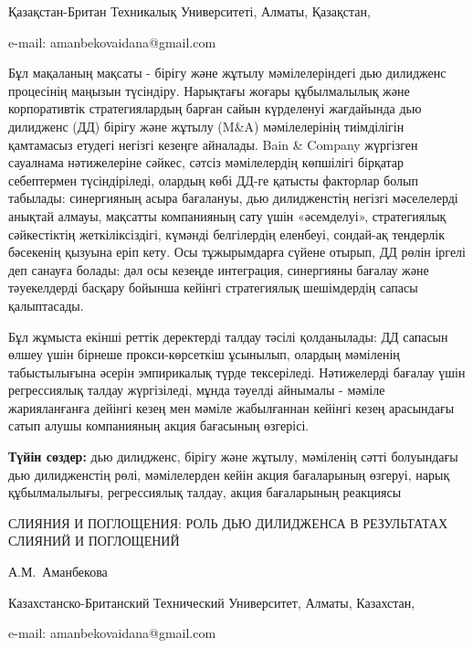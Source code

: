 \begin{affil}
Қазақстан-Британ Техникалық Университеті, Алматы, Қазақстан,

e-mail: amanbekovaidana@gmail.com
\end{affil}

Бұл мақаланың мақсаты - бірігу және жұтылу мәмілелеріндегі дью дилидженс
процесінің маңызын түсіндіру. Нарықтағы жоғары құбылмалылық және
корпоративтік стратегиялардың барған сайын күрделенуі жағдайында дью
дилидженс (ДД) бірігу және жұтылу (M\&A) мәмілелерінің тиімділігін
қамтамасыз етудегі негізгі кезеңге айналады. Bain \& Company жүргізген
сауалнама нәтижелеріне сәйкес, сәтсіз мәмілелердің көпшілігі бірқатар
себептермен түсіндіріледі, олардың көбі ДД-ге қатысты факторлар болып
табылады: синергияның асыра бағалануы, дью дилидженстің негізгі
мәселелерді анықтай алмауы, мақсатты компанияның сату үшін «әсемделуі»,
стратегиялық сәйкестіктің жеткіліксіздігі, күмәнді белгілердің еленбеуі,
сондай-ақ тендерлік бәсекенің қызуына еріп кету. Осы тұжырымдарға сүйене
отырып, ДД рөлін іргелі деп санауға болады: дәл осы кезеңде интеграция,
синергияны бағалау және тәуекелдерді басқару бойынша кейінгі
стратегиялық шешімдердің сапасы қалыптасады.

Бұл жұмыста екінші реттік деректерді талдау тәсілі қолданылады: ДД
сапасын өлшеу үшін бірнеше прокси-көрсеткіш ұсынылып, олардың мәміленің
табыстылығына әсерін эмпирикалық түрде тексеріледі. Нәтижелерді бағалау
үшін регрессиялық талдау жүргізіледі, мұнда тәуелді айнымалы - мәміле
жарияланғанға дейінгі кезең мен мәміле жабылғаннан кейінгі кезең
арасындағы сатып алушы компанияның акция бағасының өзгерісі.

{\bfseries Түйін сөздер:} дью дилидженс, бірігу және жұтылу, мәміленің
сәтті болуындағы дью дилидженстің рөлі, мәмілелерден кейін акция
бағаларының өзгеруі, нарық құбылмалылығы, регрессиялық талдау, акция
бағаларының реакциясы

\begin{header}
СЛИЯНИЯ И ПОГЛОЩЕНИЯ: РОЛЬ ДЬЮ ДИЛИДЖЕНСА В РЕЗУЛЬТАТАХ СЛИЯНИЙ И ПОГЛОЩЕНИЙ

А.М.~Аманбекова\envelope
\end{header}

\begin{affil}
Казахстанско-Британский Технический Университет, Алматы, Казахстан,

e-mail: amanbekovaidana@gmail.com
\end{affil}

